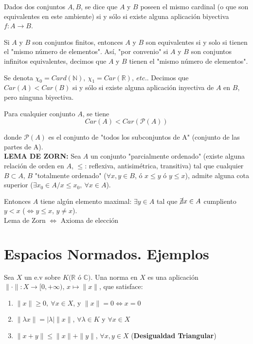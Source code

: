 \documentclass{article}
\begin{document}
\begin{enumerate}
Dados dos conjuntos $A,B$, se dice que $A$ y $B$ poseen el mismo cardinal (o que son equivalentes en este ambiente) si y sólo si existe alguna aplicación biyectiva $f:A\rightarrow B$. 

Si $A$ y $B$ son conjuntos finitos, entonces $A$ y $B$ son equivalentes si y solo si tienen el "mismo número de elementos". Así, "por convenio" si $A$ y $B$ son conjuntos infinitos equivalentes, decimos que $A$ y $B$ tienen el "mismo número de elementos".

Se denota $\chi_0=Card(\mathbb{N}),\:\chi_1=Car(\mathbb{R}),\:etc.$. Decimos que $Car(A)<Car(B)$ si y sólo si existe alguna aplicación inyectiva de $A$ en $B$, pero ninguna biyectiva. 

Para cualquier conjunto $A$, se tiene
\begin{equation*}
Car(A)<Car(\mathcal{P}(A))
\end{equation*}

donde $\mathcal{P}(A)$ es el conjunto de "todos los subconjuntos de A" (conjunto de las partes de A).\\

\textbf{LEMA DE ZORN:} Sea $A$ un conjunto "parcialmente ordenado" (existe alguna relación de orden en $A$, $\leq$: reflexiva, antisimétrica, transitiva) tal que cualquier $B\subset A$, $B$ "totalmente ordenado" ($\forall x,y\in B$, ó $x\leq y$ ó $y\leq x$), admite alguna cota superior ($\exists x_0\in A/x\leq x_0,\:\forall x\in A$). 

Entonces $A$ tiene algún elemento maximal: $\exists y\in A$ tal que $\cancel{\exists} x\in A$ cumpliento $y<x$ ($\Leftrightarrow y\leq x$, $y\neq x$).\\

Lema de Zorn $\Leftrightarrow$ Axioma de elección
\end{enumerate}

\section{Espacios Normados. Ejemplos}
Sea $X$ un e.v sobre $K(\mathbb{R}$ ó $\mathbb{C})$. Una norma en $X$ es una aplicación $\|\cdot\|:X\rightarrow [0,+\infty)$, $x\mapsto \|x\|$, que satisface:
\begin{enumerate}
\item $\|x\|\geq 0,\:\forall x\in X$, y $\|x\|=0\Leftrightarrow x=0$

\item $\|\lambda x\|=|\lambda|\|x\|$, $\forall \lambda\in K$ y $\forall x\in X$

\item $\|x+y\|\leq \|x\|+\|y\|$, $\forall x,y\in X$ (\textbf{Desigualdad Triangular})
\end{enumerate}
\end{document}
